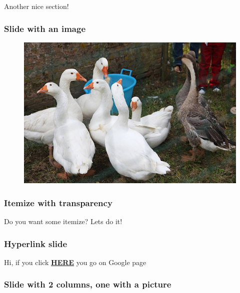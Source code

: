 \documentclass[handout,xcolor=dvipsnames,aspectratio=169]{beamer}
\begin{document}
{\begin{section}{Another nice section!}
\begin{frame}[t]
\frametitle{Slide with an image} 
\begin{figure}
  \centering
  \includegraphics[scale=0.22]{Immagini/duck.jpg}
\end{figure}
\end{frame}

\begin{frame}[t]
\frametitle{Itemize with transparency}
Do you want some itemize? Lets do it!
\begin{itemize}
\end{itemize}
\end{frame}

\end{section}

\begin{frame}[t]
\frametitle{Hyperlink slide} 
Hi, if you click \textbf{\href{https://www.google.com}{HERE}} you go on Google page 
\end{frame}

\begin{frame}
\frametitle{Slide with 2 columns, one with a picture}

\begin{columns}


\end{columns}
\end{frame}}
\end{document}
